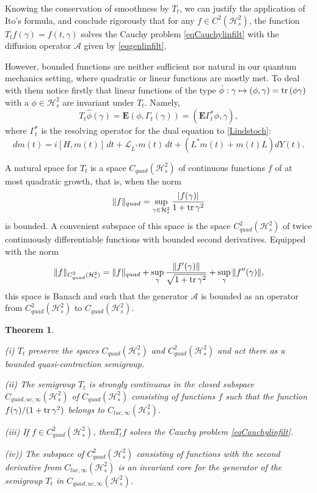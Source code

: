 \documentclass[12pt]{article}
\def\AC{\mathcal{A}}
\def\LC{\mathcal{L}}
\def\HC{\mathcal{H}}
\def\E{\mathbf{E}}
\def\tr{\rm{tr}}
\def\ga{\gamma}
\newtheorem{theorem}{Theorem}[section]
\newcommand{\Ga}{\Gamma}
\begin{document}
Knowing the conservation of smoothness by $T_t$, we can justify the application of Ito's formula,
and conclude rigorously
that for any $f\in C^2(\HC^2_s)$,
the function $T_tf(\ga)=f(t,\ga)$ solves the Cauchy problem
\eqref{eqCauchylinfilt} with the diffusion operator $\AC$ given by
\eqref{eqgenlinfilt}.

However, bounded functions are neither sufficient nor natural in our quantum mechanics setting,
where quadratic or linear functions are mostly met. To deal with them notice firstly that
linear functions of the type $\hat \phi: \ga \mapsto (\phi, \ga)={\tr}\, (\phi \ga)$ with a $\phi \in \HC^2_s$
are invariant under $T_t$. Namely,
\[
T_t \hat \phi (\ga)=\E (\phi, \Ga_t(\ga))=(\E \Ga_t^* \phi, \ga),
\]
where $\Ga_t^*$ is the resolving operator for the dual equation to \eqref{Lindstoch}:
\begin{equation}
\label{Lindstochdu}
dm(t)=i[H,m(t)] \, dt +\LC_{L^*} m(t) \, dt +(L^* m(t)+ m(t) L) dY(t).
\end{equation}

A natural space for $T_t$ is a space $C_{quad}(\HC^2_s)$ of continuous functions $f$
of at most quadratic growth, that is, when the norm
\[
\|f\|_{quad}=\sup_{\ga \in \HC^2_s} \frac{|f(\ga)|}{1+{\tr} \, \ga^2}
\]
is bounded. A convenient subspace of this space is the space $C^2_{quad}(\HC^2_s)$
of twice continuously differentiable functions with bounded second derivatives.
Equipped with the norm
\[
\|f\|_{C^2_{quad}(\HC^2_s)}=\|f\|_{quad}+\sup_{\ga} \frac{\|f'(\ga)\|}{\sqrt{1+{\tr} \, \ga^2}}
+\sup_{\ga} \|f''(\ga)\|,
\]
this space is Banach and such that the generator $\AC$ is bounded as an operator
from $C^2_{quad}(\HC^2_s)$ to $C_{quad}(\HC^2_s)$.

\begin{theorem}
\label{Linsdesem1}

(i) $T_t$ preserve the spaces $C_{quad}(\HC^2_s)$ and $C^2_{quad}(\HC^2_s)$
and act there as a bounded quasi-contraction semigroup.

(ii) The semigroup $T_t$ is strongly continuous in the closed subspace $C_{quad,uc,\infty}(\HC^2_s)$
of $C_{quad}(\HC^2_s)$ consisting of functions $f$ such that the function $f(\ga)/(1+{\tr}\, \ga^2)$
belongs to  $C_{luc,\infty}(\HC^2_s)$.

(iii) If $f\in C^2_{quad}(\HC^2_s)$, then$T_tf$ solves the Cauchy problem \eqref{eqCauchylinfilt}.

(iv)) The subspace of $C_{quad}^2(\HC^2_s)$ consisting of functions with the second derivative from
$C_{luc,\infty}(\HC^2_s)$ is an invariant core for the generator of the semigroup $T_t$ in $C_{quad,uc,\infty}(\HC^2_s)$.
 \end{theorem}
\end{document}
